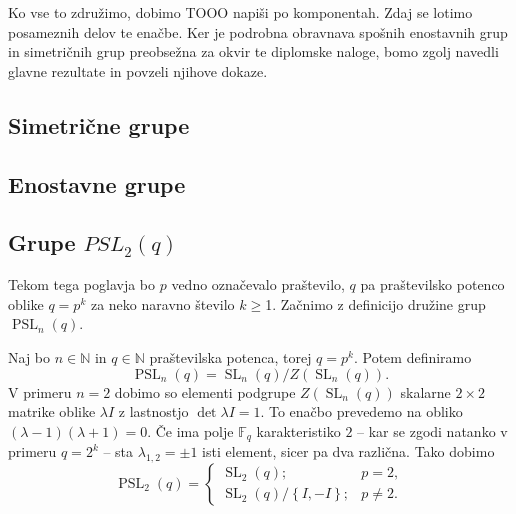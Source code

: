 \documentclass[mat1, tisk]{fmfdelo}
\numberwithin{equation}{section}  %
\begin{document}
Ko vse to združimo, dobimo TOOO napiši po komponentah. Zdaj se lotimo posameznih delov te enačbe. Ker je podrobna obravnava spošnih enostavnih grup in simetričnih grup preobsežna za okvir te diplomske naloge, bomo zgolj navedli glavne rezultate in povzeli njihove dokaze.


\subsection{Simetrične grupe}


\subsection{Enostavne grupe}


\subsection{Grupe $PSL_2(q)$}

Tekom tega poglavja bo $p$ vedno označevalo praštevilo, $q$ pa praštevilsko potenco oblike $q = p^{k}$ za neko naravno število $k \ge $1. Začnimo z definicijo družine grup $\operatorname{PSL}_n(q)$.

\begin{definicija}
    Naj bo $n \in \mathbb{N}$ in $q \in \mathbb{N}$ praštevilska potenca, torej $q = p^{k}$. Potem definiramo \begin{equation*}
        \operatorname{PSL}_n(q) = {\operatorname{SL}_n(q)} / {Z(\operatorname{SL}_n(q))}.
     \end{equation*}   
    V primeru $n = 2$ dobimo so elementi podgrupe $Z(\operatorname{SL}_n(q))$ skalarne $2 \times 2$ matrike oblike $\lambda I$ z lastnostjo $\det \lambda I = 1$. To enačbo prevedemo na obliko $(\lambda - 1)(\lambda + 1) = 0$.
    Če ima polje $\mathbb{F}_q$ karakteristiko $2$ -- kar se zgodi natanko v primeru $q = 2^{k}$ -- sta $\lambda_{1,2} = \pm 1$ isti element, sicer pa dva različna. Tako dobimo
    \begin{equation*}
                \operatorname{PSL}_2(q) = \begin{cases}
                    \operatorname{SL}_2(q); & p = 2,  \\
                    {\operatorname{SL}_2(q)} / {\left\{ I, -I \right\} }; & p \neq 2.
                \end{cases}
             \end{equation*}   
    \end{definicija}
    
\end{document}
